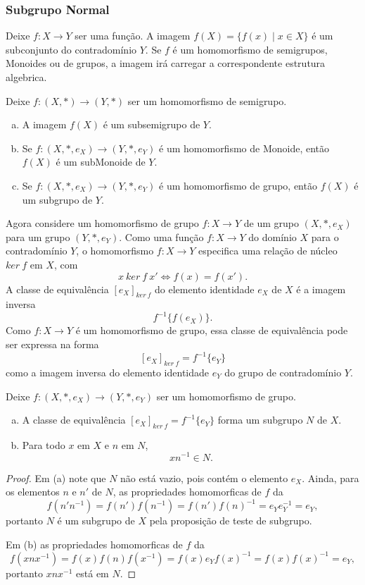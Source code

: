 \subsubsection{Subgrupo Normal}
Deixe $f: X\to Y$ ser uma função. A imagem $f(X) = \{f(x) \mid x \in X\}$ é um subconjunto do contradomínio $Y$.
Se $f$ é um homomorfismo de semigrupos, Monoides ou de grupos, a imagem irá carregar a correspondente estrutura algebrica.
\begin{stat}
  Deixe $f: (X,*) \to (Y,*)$ ser um homomorfismo de semigrupo.
  \begin{enumerate}[(a)]
    \item A imagem $f(X)$ é um subsemigrupo de $Y$.
    \item Se $f: (X,*,e_{X}) \to (Y,*,e_{Y})$ é um homomorfismo de Monoide, então $f(X)$ é um subMonoide de $Y$.
    \item Se $f: (X,*,e_{X}) \to (Y,*,e_{Y})$ é um homomorfismo de grupo, então $f(X)$ é um subgrupo de $Y$.
  \end{enumerate}
\end{stat}
Agora considere um homomorfismo de grupo $f:X\to Y$ de um grupo $(X,*,e_{X})$ para um grupo $(Y,*,e_{Y})$. Como uma função $f: X\to Y$ do domínio $X$ para o contradomínio $Y$, o homomorfismo $f: X\to Y$ especifica uma relação de núcleo $ker\ f$ em $X$, com
$$ x\ ker\ f\ x' \Leftrightarrow f(x)=f(x').$$
A classe de equivalência $[e_{X}]_{ker\ f}$ do elemento identidade $e_{X}$ de $X$ é a imagem inversa $$f^{-1}\{f(e_{X})\}.$$
Como $f: X\to Y$ é um homomorfismo de grupo, essa classe de equivalência pode ser expressa na forma $$[e_{X}]_{ker\ f}=f^{-1}\{e_{Y}\}$$ como a imagem inversa do elemento identidade $e_{Y}$ do grupo de contradomínio $Y$.
\begin{stat}
  Deixe $f: (X,*,e_{X}) \to (Y,*,e_{Y})$ ser um homomorfismo de grupo.
  \begin{enumerate}[(a)]
    \item A classe de equivalência $[e_{X}]_{ker\ f}=f^{-1}\{e_{Y}\}$ forma um subgrupo $N$ de $X$.
    \item Para todo $x$ em $X$ e $n$ em $N$, $$xn^{-1} \in N.$$
  \end{enumerate}
  \begin{proof}
    Em (a) note que $N$ não está vazio, pois contém o elemento $e_{X}.$ Ainda, para os elementos $n$ e $n'$ de $N$, as propriedades homomorficas de $f$ da $$f(n'n^{-1})= f(n')f(n^{-1})=f(n')f(n)^{-1}=e_{Y}e_{Y}^{-1}=e_{Y},$$ portanto $N$ é um subgrupo de $X$ pela proposição de teste de subgrupo.

    Em (b) as propriedades homomorficas de $f$ da $$f(xnx^{-1})=f(x)f(n)f(x^{-1})=f(x)e_{Y}f(x)^{-1} = f(x)f(x)^{-1}=e_{Y},$$ portanto $xnx^{-1}$ está em $N$.
  \end{proof}
\end{stat}
